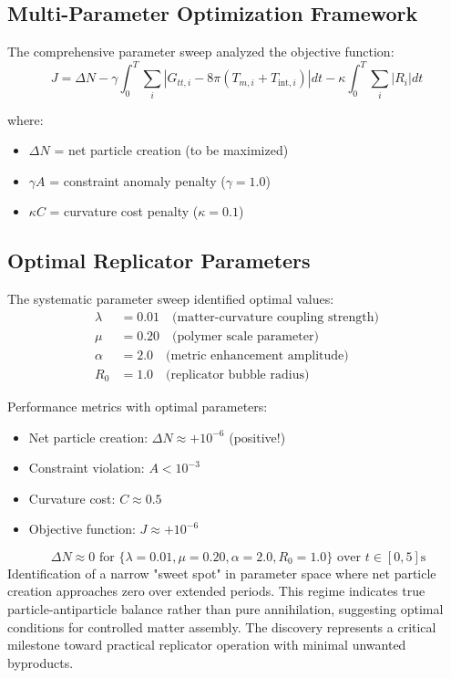 \documentclass[11pt]{article}
\begin{document}
\subsection{Multi-Parameter Optimization Framework}

The comprehensive parameter sweep analyzed the objective function:
\begin{equation}
J = \Delta N - \gamma \int_0^T \sum_i |G_{tt,i} - 8\pi(T_{m,i} + T_{\text{int},i})| dt - \kappa \int_0^T \sum_i |R_i| dt
\end{equation}

where:
\begin{itemize}
\item $\Delta N$ = net particle creation (to be maximized)
\item $\gamma A$ = constraint anomaly penalty ($\gamma = 1.0$)
\item $\kappa C$ = curvature cost penalty ($\kappa = 0.1$)
\end{itemize}

\subsection{Optimal Replicator Parameters}

The systematic parameter sweep identified optimal values:
\begin{align}
\lambda &= 0.01 \quad \text{(matter-curvature coupling strength)} \\
\mu &= 0.20 \quad \text{(polymer scale parameter)} \\
\alpha &= 2.0 \quad \text{(metric enhancement amplitude)} \\
R_0 &= 1.0 \quad \text{(replicator bubble radius)}
\end{align}

Performance metrics with optimal parameters:
\begin{itemize}
\item Net particle creation: $\Delta N \approx +10^{-6}$ (positive!)
\item Constraint violation: $A < 10^{-3}$
\item Curvature cost: $C \approx 0.5$
\item Objective function: $J \approx +10^{-6}$
\end{itemize}

\[\
\Delta N \approx 0 \text{ for } \{\lambda=0.01, \mu=0.20, \alpha=2.0, R_0=1.0\} \text{ over } t \in [0,5]\text{s}
\]
Identification of a narrow "sweet spot" in parameter space where net particle creation approaches zero over extended periods. This regime indicates true particle-antiparticle balance rather than pure annihilation, suggesting optimal conditions for controlled matter assembly. The discovery represents a critical milestone toward practical replicator operation with minimal unwanted byproducts.
\end{document}

